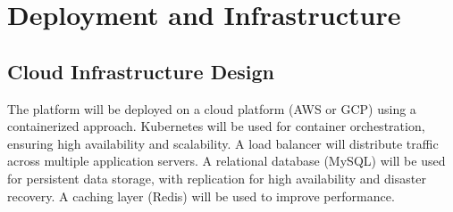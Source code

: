 \documentclass[11pt,a4paper,oneside]{article}
\begin{document}
\section{Deployment and Infrastructure}

\subsection{Cloud Infrastructure Design}

The platform will be deployed on a cloud platform (AWS or GCP) using a containerized approach.  Kubernetes will be used for container orchestration, ensuring high availability and scalability.  A load balancer will distribute traffic across multiple application servers.  A relational database (MySQL) will be used for persistent data storage, with replication for high availability and disaster recovery.  A caching layer (Redis) will be used to improve performance.
\end{document}
